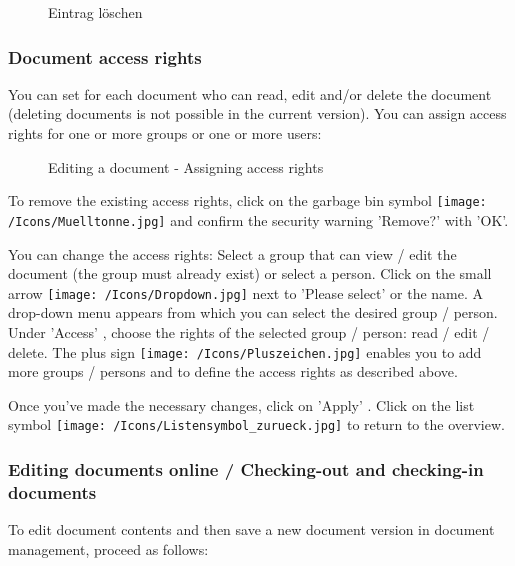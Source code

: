 \begin{figure}[H]
\caption{Eintrag löschen}
\end{figure}

\subsubsection{Document access rights}
\label{bkm:Ref442869495}

You can set for each document who can read, edit and/or delete the document (deleting documents is not possible in the current version). You can assign access rights for one or more groups or one or more users:

\begin{figure}[H]
\caption{Editing a document - Assigning access rights}
\end{figure}

To remove the existing access rights, click on the garbage bin symbol \texttt{[image: /Icons/Muelltonne.jpg]}  and confirm the security warning 'Remove?' with 'OK'.  \newline

You can change the access rights: Select a group that can view / edit the document (the group must already exist) or select a person. Click on the small arrow \texttt{[image: /Icons/Dropdown.jpg]}  next to 'Please select' or the name. A drop-down menu appears from which you can select the desired group / person. Under 'Access' , choose the rights of the selected group / person: read / edit / delete. The plus sign \texttt{[image: /Icons/Pluszeichen.jpg]}  enables you to add more groups / persons and to define the access rights as described above. \newline

Once you've made the necessary changes, click on 'Apply' . Click on the list symbol \texttt{[image: /Icons/Listensymbol\_zurueck.jpg]}  to return to the overview.

\subsubsection{Editing documents online / Checking-out and checking-in documents}
\label{bkm:Ref442780171}\label{bkm:Ref442776572}

To edit document contents and then save a new document version in document management, proceed as follows:

